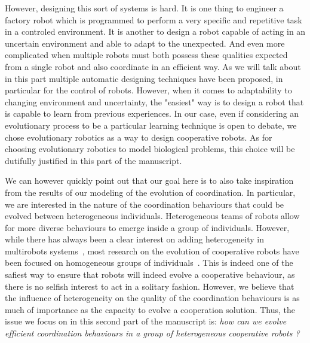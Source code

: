     However, designing this sort of systems is hard. It is one thing to engineer a factory robot which is programmed to perform a very specific and repetitive task in a controled environment. It is another to design a robot capable of acting in an uncertain environment and able to adapt to the unexpected. And even more complicated when multiple robots must both possess these qualities expected from a single robot and also coordinate in an efficient way. As we will talk about in this part multiple automatic designing techniques have been proposed, in particular for the control of robots. However, when it comes to adaptability to changing environment and uncertainty, the "easiest" way is to design a robot that is capable to learn from previous experiences. In our case, even if considering an evolutionary process to be a particular learning technique is open to debate, we chose evolutionary robotics as a way to design cooperative robots. As for choosing evolutionary robotics to model biological problems, this choice will be dutifully justified in this part of the manuscript. 

    We can however quickly point out that our goal here is to also take inspiration from the results of our modeling of the evolution of coordination. In particular, we are interested in the nature of the coordination behaviours that could be evolved between heterogeneous individuals. Heterogeneous teams of robots allow for more diverse behaviours to emerge inside a group of individuals. However, while there has always been a clear interest on adding heterogeneity in multirobots systems~\parencite{Parker1994, Parker2008}, most research on the evolution of cooperative robots have been focused on homogeneous groups of individuals~\parencite{Waibel2009}. This is indeed one of the safiest way to ensure that robots will indeed evolve a cooperative behaviour, as there is no selfish interest to act in a solitary fashion. However, we believe that the influence of heterogeneity on the quality of the coordination behaviours is as much of importance as the capacity to evolve a cooperation solution. Thus, the issue we focus on in this second part of the manuscript is: \emph{how can we evolve efficient coordination behaviours in a group of heterogeneous cooperative robots ?}
